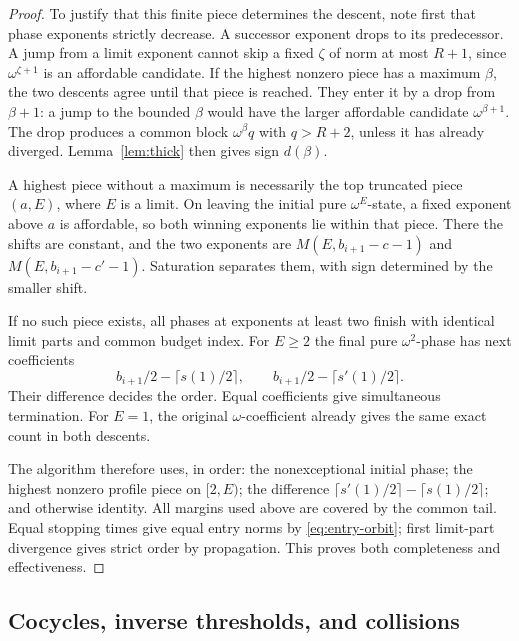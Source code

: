 \begin{proof}
To justify that this finite piece determines the descent, note first
that phase exponents strictly decrease. A successor exponent drops to
its predecessor. A jump from a limit exponent cannot skip a fixed
\(\zeta\) of norm at most \(R+1\), since
\(\omega^{\zeta+1}\) is an affordable candidate. If the highest
nonzero piece has a maximum \(\beta\), the two descents agree until
that piece is reached. They enter it by a drop from \(\beta+1\):
a jump to the bounded \(\beta\) would have the larger affordable
candidate \(\omega^{\beta+1}\). The drop produces a common block
\(\omega^\beta q\) with \(q>R+2\), unless it has already diverged.
Lemma~\ref{lem:thick} then gives sign \(d(\beta)\).

A highest piece without a maximum is necessarily the top truncated
piece \((a,E)\), where \(E\) is a limit. On leaving the initial
pure \(\omega^E\)-state, a fixed exponent above \(a\) is affordable,
so both winning exponents lie within that piece. There the shifts are
constant, and the two exponents are
\(M(E,b_{i+1}-c-1)\) and \(M(E,b_{i+1}-c'-1)\).
Saturation separates them, with sign determined by the smaller shift.

If no such piece exists, all phases at exponents at least two finish
with identical limit parts and common budget index. For \(E\ge2\)
the final pure \(\omega^2\)-phase has next coefficients
\[
 b_{i+1}/2-\lceil s(1)/2\rceil,\qquad
 b_{i+1}/2-\lceil s'(1)/2\rceil.
\]
Their difference decides the order. Equal coefficients give simultaneous
termination. For \(E=1\), the original \(\omega\)-coefficient
already gives the same exact count in both descents.

The algorithm therefore uses, in order: the nonexceptional initial
phase; the highest nonzero profile piece on \([2,E)\); the difference
\(\lceil s'(1)/2\rceil-\lceil s(1)/2\rceil\); and otherwise
identity. All margins used above are covered by the common
tail. Equal stopping times give equal entry norms by
\eqref{eq:entry-orbit}; first limit-part divergence gives strict order
by propagation. This proves both completeness and effectiveness.
\end{proof}

\subsection{Cocycles, inverse thresholds, and collisions}

